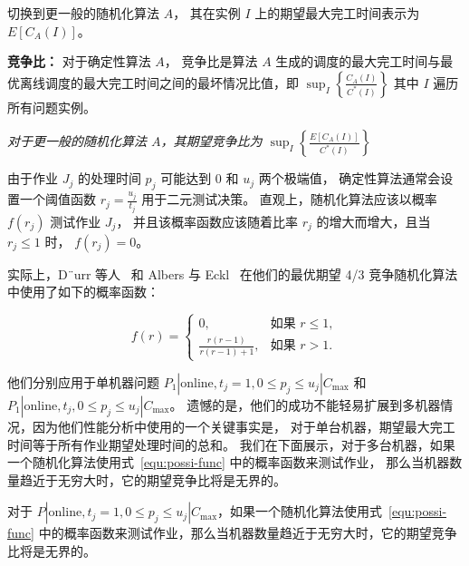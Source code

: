 切换到更一般的随机化算法 \( A \)，
其在实例 \( I \) 上的期望最大完工时间表示为 \( E[C_A(I)] \)。

\begin{defi}
    \textbf{竞争比：}
    对于确定性算法 \( A \)，
    竞争比是算法 \( A \) 生成的调度的最大完工时间与最优离线调度的最大完工时间之间的最坏情况比值，即
    \(
    \sup_I \left\{ \frac{C_A(I)}{C^*(I)} \right\}
    \)
    其中 \( I \) 遍历所有问题实例。
\end{defi}

\emph{对于更一般的随机化算法 \( A \)，其期望竞争比为
\(
\sup_I \left\{ \frac{E[C_A(I)]}{C^*(I)} \right\}
\)
}

由于作业 \( J_j \) 的处理时间 \( p_j \) 可能达到 0 和 \( u_j \) 两个极端值，
确定性算法通常会设置一个阈值函数 \( r_j = \frac{u_j}{t_j} \) 用于二元测试决策。
直观上，随机化算法应该以概率 \( f(r_j) \) 测试作业 \( J_j \)，
并且该概率函数应该随着比率 \( r_j \) 的增大而增大，且当 \( r_j \leq 1 \) 时，
\( f(r_j) = 0 \)。

实际上，D¨urr 等人~\cite{durr2018scheduling,durr2020adversarial} 和 Albers 与 Eckl~\cite{albers2021explorable} 在他们的最优期望 4/3 竞争随机化算法中使用了如下的概率函数：

\begin{equation}
f(r) = 
\begin{cases}
0, & \text{如果 } r \leq 1, \\
\frac{r(r-1)}{r(r-1)+1}, & \text{如果 } r > 1.
\end{cases}
\label{equ:possi-func}
\end{equation}

他们分别应用于单机器问题 \( P_1 | \text{online}, t_j = 1, 0 \leq p_j \leq u_j | C_{\text{max}} \) 和 \( P_1 | \text{online}, t_j, 0 \leq p_j \leq u_j | C_{\text{max}} \)。
遗憾的是，他们的成功不能轻易扩展到多机器情况，因为他们性能分析中使用的一个关键事实是，
对于单台机器，期望最大完工时间等于所有作业期望处理时间的总和。
我们在下面展示，对于多台机器，如果一个随机化算法使用式~\ref{equ:possi-func} 中的概率函数来测试作业，
那么当机器数量趋近于无穷大时，它的期望竞争比将是无界的。

\begin{lem}
\label{lem1}
对于 \( P | \text{online}, t_j = 1, 0 \leq p_j \leq u_j | C_{\text{max}} \)，如果一个随机化算法使用式~\ref{equ:possi-func} 中的概率函数来测试作业，那么当机器数量趋近于无穷大时，它的期望竞争比将是无界的。
\end{lem}

